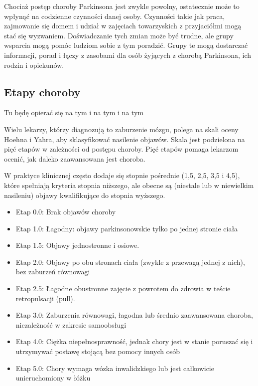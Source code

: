 Chociaż postęp choroby Parkinsona jest zwykle powolny, ostatecznie może to wpłynąć na codzienne czynności danej osoby. Czynności takie jak praca, zajmowanie się domem i udział w zajęciach towarzyskich z przyjaciółmi mogą stać się wyzwaniem. Doświadczanie tych zmian może być trudne, ale grupy wsparcia mogą pomóc ludziom sobie z tym poradzić. Grupy te mogą dostarczać informacji, porad i łączy z zasobami dla osób żyjących z chorobą Parkinsona, ich rodzin i opiekunów.



\subsection{Etapy choroby}
\label{subsec:etapy}

Tu będę opierać się na tym\cite{Szurek_2018} i na tym\cite{Wieczorek_2013} i na tym\cite{Kuryłowicz_2019}

Wielu lekarzy, którzy diagnozują to zaburzenie mózgu, polega na skali oceny Hoehna i Yahra, aby sklasyfikować nasilenie objawów.
Skala jest podzielona na pięć etapów w zależności od postępu choroby.
Pięć etapów pomaga lekarzom ocenić, jak daleko zaawansowana jest choroba.

W praktyce klinicznej często dodaje się stopnie pośrednie (1,5, 2,5, 3,5 i 4,5), które spełniają kryteria stopnia niższego, ale obecne są (niestale lub w niewielkim nasileniu) objawy kwalifikujące do stopnia wyższego.

\begin{itemize}[itemsep=0.5pt]
	\item Etap 0.0: Brak objawów choroby
	\item Etap 1.0: Łagodny: objawy parkinsonowskie tylko po jednej stronie ciała
	\item Etap 1.5: Objawy jednostronne i osiowe.
	\item Etap 2.0: Objawy po obu stronach ciała (zwykle z przewagą jednej z nich), bez zaburzeń równowagi
	\item Etap 2.5: Łagodne obustronne zajęcie z powrotem do zdrowia w teście retropulsacji (pull).
	\item Etap 3.0: Zaburzenia równowagi, łagodna lub średnio zaawansowana choroba, niezależność w zakresie samoobsługi
	\item Etap 4.0: Ciężka niepełnosprawność, jednak chory jest w stanie poruszać się i utrzymywać postawę stojącą bez pomocy innych osób
	\item Etap 5.0: Chory wymaga wózka inwalidzkiego lub jest całkowicie unieruchomiony w łóżku
\end{itemize}

